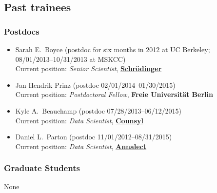 \documentclass[10pt]{article}
\begin{document}
\eject

\subsection*{Past trainees}

\subsubsection*{Postdocs}

\begin{itemize}
  \item Sarah E.~Boyce (postdoc for six months in 2012 at UC Berkeley;\\
  08/01/2013--10/31/2013 at MSKCC)\\
  Current position: \emph{Senior Scientist},  \href{http://www.schrodinger.com}{{\bf Schr\"{o}dinger}}
  
  \item Jan-Hendrik Prinz (postdoc 02/01/2014--01/30/2015)\\
  Current position: \emph{Postdoctoral Fellow}, {\bf Freie Universit\"{a}t Berlin}
  
  \item Kyle A.~Beauchamp (postdoc 07/28/2013--06/12/2015)\\
  Current position: \emph{Data Scientist}, \href{http://www.schrodinger.com}{{\bf Counsyl}}
  
  \item Daniel L.~Parton (postdoc 11/01/2012--08/31/2015)\\
  Current position: \emph{Data Scientist}, \href{http://www.annalect.com}{{\bf Annalect}}
  
\end{itemize}

\subsubsection*{Graduate Students}

None

\eject


\end{document}

